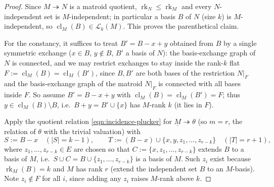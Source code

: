 \documentclass{article}
\theoremstyle{definition}
\newcommand{\rk}{\operatorname{rk}}
\newcommand{\cl}{\operatorname{cl}}
\newcommand{\onto}{\twoheadrightarrow}
\newcommand{\cLL}{\mathcal{L}}
\begin{document}
\begin{proof}
Since $M\onto N$ is a matroid quotient, $\rk_N\le\rk_M$ and every $N$-independent set is
$M$-independent; in particular a basis $B$ of $N$ (size $k$) is $M$-independent, so
$\cl_M(B)\in\cLL_k(M)$. This proves the parenthetical claim.

For the constancy, it suffices to treat $B'=B-x+y$ obtained from $B$ by a single symmetric exchange
($x\in B$, $y\notin B$, $B'$ a basis of $N$): the basis-exchange graph of $N$ is connected, and we
may restrict exchanges to stay inside the rank-$k$ flat $F:=\cl_M(B)=\cl_M(B')$, since $B,B'$ are
both bases of the restriction $N|_F$ and the basis-exchange graph of the matroid $N|_F$ is connected
with all bases inside $F$. So assume $B'=B-x+y$ with $\cl_M(B)=\cl_M(B')=F$; thus
$y\in\cl_M(B)\setminus B$, i.e.\ $B+y=B'\cup\{x\}$ has $M$-rank $k$ (it lies in $F$).

Apply the quotient relation \eqref{eqn:incidence-plucker} for $\underline M\onto\theta$ (so $m=r$,
the relation of $\theta$ with the trivial valuation) with
\[
  S:=B-x\quad(|S|=k-1),\qquad T:=(B-x)\cup\{x,y,z_1,\dots,z_{r-k}\}\quad(|T|=r+1),
\]
where $z_1,\dots,z_{r-k}\in E$ are chosen so that $C:=\{x,z_1,\dots,z_{r-k}\}$ extends $B$ to a basis
of $M$, i.e.\ $S\cup C=B\cup\{z_1,\dots,z_{r-k}\}$ is a basis of $M$. Such $z_i$ exist because
$\rk_M(B)=k$ and $M$ has rank $r$ (extend the independent set $B$ to an $M$-basis). Note $z_i\notin
F$ for all $i$, since adding any $z_i$ raises $M$-rank above $k$.


\end{proof}
\end{document}
